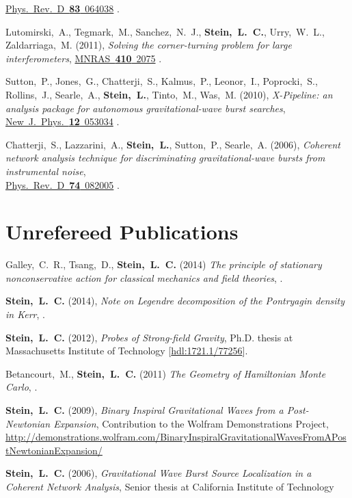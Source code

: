 \begin{etaremune}[start=\value{pubCounter}]
  \href{http://dx.doi.org/10.1103/PhysRevD.83.064038}{Phys.~Rev.~D~{\bf 83}~064038}
  .
\item
  Lutomirski,~A., Tegmark,~M., Sanchez,~N.~J., {\bf
    Stein,~L.~C.}, Urry,~W.~L., Zaldarriaga,~M.
  (2011),
  {\it Solving the corner-turning problem for large interferometers},
  \href{http://dx.doi.org/10.1111/j.1365-2966.2010.17587.x}{MNRAS~{\bf 410}~2075}
  .
\item
  Sutton,~P., Jones,~G., Chatterji,~S., Kalmus,~P., Leonor,~I.,
  Poprocki,~S., Rollins,~J., Searle,~A., {\bf Stein,~L.}, Tinto,~M.,
  Was,~M.
  (2010),
  {\it X-Pipeline: an analysis package for autonomous
    gravitational-wave burst searches},
  \href{http://dx.doi.org/10.1088/1367-2630/12/5/053034}{New~J.~Phys.~{\bf 12}~053034}
  .
\item
  Chatterji,~S., Lazzarini,~A., {\bf Stein,~L.}, Sutton,~P.,
  Searle,~A.
  (2006),
  {\it Coherent network analysis technique for
    discriminating gravitational-wave bursts from instrumental noise},\\
  \href{http://dx.doi.org/10.1103/PhysRevD.74.082005}{Phys.~Rev.~D~{\bf 74}~082005}
  .
  \setcounter{pubCounter}{\value{enumi}}
\end{etaremune}

\section{\sc Unrefereed Publications}
\addtocounter{pubCounter}{-1}
\begin{etaremune}[start=\value{pubCounter}]
\item
  Galley,~C.~R., Tsang,~D., {\bf Stein,~L.~C.}
  (2014)
  {\it The principle of stationary nonconservative action for
    classical mechanics and field theories},
  .
\item
  {\bf Stein,~L.~C.}
  (2014),
  {\it Note on Legendre decomposition of the Pontryagin density in Kerr},
  .
\item
  {\bf Stein,~L.~C.}
  (2012),
  {\it Probes of Strong-field Gravity}, Ph.D. thesis at Massachusetts
  Institute of Technology
  [\href{http://hdl.handle.net/1721.1/77256}{hdl:1721.1/77256}].
\item
  Betancourt,~M., {\bf Stein,~L.~C.}
  (2011)
  {\it The Geometry of Hamiltonian Monte Carlo},
  .
\item
  {\bf Stein,~L.~C.}
  (2009),
  {\it Binary Inspiral Gravitational Waves from a Post-Newtonian Expansion},
  Contribution to the Wolfram Demonstrations Project,
  \url{http://demonstrations.wolfram.com/BinaryInspiralGravitationalWavesFromAPostNewtonianExpansion/}
\item
  {\bf Stein,~L.~C.}
  (2006),
  {\it Gravitational Wave Burst Source Localization in a Coherent
    Network Analysis},
  Senior thesis at California Institute of Technology
\end{etaremune}



